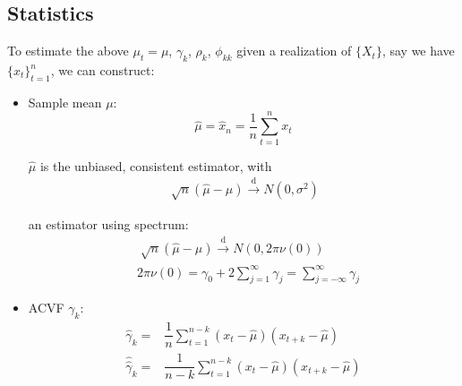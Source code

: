 \begin{itemize}[topsep=2pt,itemsep=0pt]
\begin{itemize}[topsep=2pt,itemsep=0pt]
            
            
        \end{itemize}
        
            

        
        
        
    \end{itemize}

\subsection{Statistics}

    To estimate the above $ \mu _t=\mu $, $ \gamma _k $, $ \rho _k $, $ \phi _{kk} $ given a realization of $ \{X_t\} $, say we have $ \{x_t\}_{t=1}^n $, we can construct:
    \begin{itemize}[topsep=2pt,itemsep=0pt]
        \item Sample mean $ \mu  $:
        \begin{equation}
            \hat{\mu }=\hat{x}_n=\dfrac{1}{n}\sum_{t=1}^nx_t 
        \end{equation}

        $ \hat{\mu } $ is the unbiased, consistent estimator, with
        \begin{align}
            \sqrt[]{n}(\hat{\mu }-\mu )\xrightarrow[]{\mathrm{d}} N(0,\sigma ^2) 
        \end{align}
        
        an estimator using spectrum:
        \begin{align}
            &\sqrt[]{n}(\hat{\mu }-\mu )\xrightarrow[]{\mathrm{d}} N(0,2\pi \nu (0))\\
            &2\pi \nu (0)=\gamma _0+2\sum_{j=1}^\infty \gamma _j=\sum_{j=-\infty}^\infty \gamma _j 
        \end{align}
        
        \item ACVF $ \gamma _k $:
        \begin{align}
            \hat{\gamma }_k=&\dfrac{1}{n}\sum_{t=1}^{n-k}(x_t-\hat{\mu })(x_{t+k}-\hat{\mu }) \\
            \hat{\hat{\gamma }}_k=&\dfrac{1}{n-k}\sum_{t=1}^{n-k}(x_t-\hat{\mu })(x_{t+k}-\hat{\mu }) 
        \end{align}


\end{itemize}
